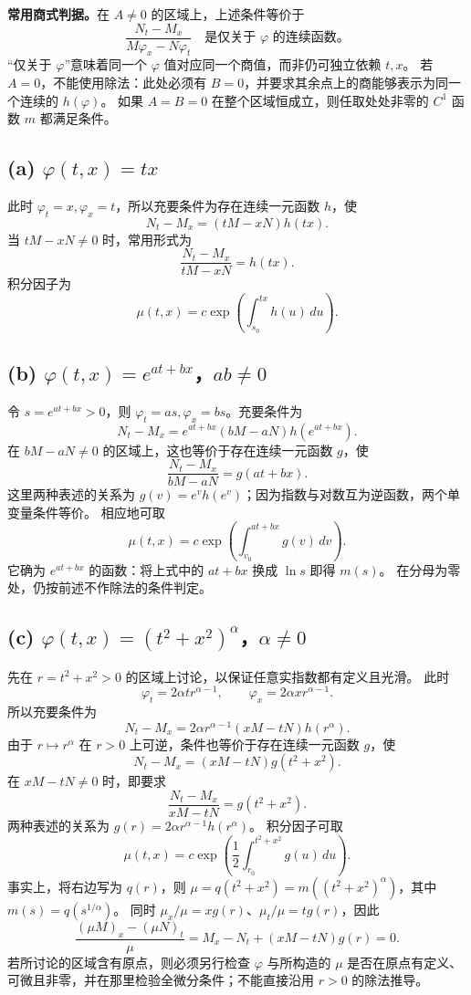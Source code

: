 \documentclass[11pt,a4paper]{ctexart}
\begin{document}
\textbf{常用商式判据。}在 $A\ne0$ 的区域上，上述条件等价于
\[\frac{N_t-M_x}{M\varphi_x-N\varphi_t}
\quad\text{是仅关于 $\varphi$ 的连续函数。}\]
“仅关于 $\varphi$”意味着同一个 $\varphi$ 值对应同一个商值，而非仍可独立依赖 $t,x$。
若 $A=0$，不能使用除法：此处必须有 $B=0$，并要求其余点上的商能够表示为同一个连续的 $h(\varphi)$。
如果 $A=B=0$ 在整个区域恒成立，则任取处处非零的 $C^1$ 函数 $m$ 都满足条件。

\subsection*{(a) $\varphi(t,x)=tx$}
此时 $\varphi_t=x,\varphi_x=t$，所以充要条件为存在连续一元函数 $h$，使
\[\boxed{N_t-M_x=(tM-xN)h(tx).}\]
当 $tM-xN\ne0$ 时，常用形式为
\[\boxed{\frac{N_t-M_x}{tM-xN}=h(tx).}\]
积分因子为
\[\boxed{\mu(t,x)=c\exp\left(\int_{s_0}^{tx}h(u)\,du\right).}\]

\subsection*{(b) $\varphi(t,x)=e^{at+bx}$，$ab\ne0$}
令 $s=e^{at+bx}>0$，则 $\varphi_t=as,\varphi_x=bs$。充要条件为
\[\boxed{N_t-M_x=e^{at+bx}(bM-aN)h(e^{at+bx}).}\]
在 $bM-aN\ne0$ 的区域上，这也等价于存在连续一元函数 $g$，使
\[\boxed{\frac{N_t-M_x}{bM-aN}=g(at+bx).}\]
这里两种表述的关系为 $g(v)=e^v h(e^v)$；因为指数与对数互为逆函数，两个单变量条件等价。
相应地可取
\[\boxed{\mu(t,x)=c\exp\left(\int_{v_0}^{at+bx}g(v)\,dv\right).}\]
它确为 $e^{at+bx}$ 的函数：将上式中的 $at+bx$ 换成 $\ln s$ 即得 $m(s)$。
在分母为零处，仍按前述不作除法的条件判定。

\subsection*{(c) $\varphi(t,x)=(t^2+x^2)^\alpha$，$\alpha\ne0$}
先在 $r=t^2+x^2>0$ 的区域上讨论，以保证任意实指数都有定义且光滑。
此时
\[\varphi_t=2\alpha t r^{\alpha-1},\qquad
\varphi_x=2\alpha x r^{\alpha-1}.
\]
所以充要条件为
\[\boxed{N_t-M_x=2\alpha r^{\alpha-1}(xM-tN)h(r^\alpha).}\]
由于 $r\mapsto r^\alpha$ 在 $r>0$ 上可逆，条件也等价于存在连续一元函数 $g$，使
\[\boxed{N_t-M_x=(xM-tN)g(t^2+x^2).}\]
在 $xM-tN\ne0$ 时，即要求
\[\boxed{\frac{N_t-M_x}{xM-tN}=g(t^2+x^2).}\]
两种表述的关系为 $g(r)=2\alpha r^{\alpha-1}h(r^\alpha)$。
积分因子可取
\[\boxed{\mu(t,x)=c\exp\left(\frac12\int_{r_0}^{t^2+x^2}g(u)\,du\right).}\]
事实上，将右边写为 $q(r)$，则 $\mu=q(t^2+x^2)=m((t^2+x^2)^\alpha)$，其中 $m(s)=q(s^{1/\alpha})$。
同时 $\mu_x/\mu=xg(r)$、$\mu_t/\mu=tg(r)$，因此
\[\frac{(\mu M)_x-(\mu N)_t}{\mu}
=M_x-N_t+(xM-tN)g(r)=0.
\]
若所讨论的区域含有原点，则必须另行检查 $\varphi$ 与所构造的 $\mu$ 是否在原点有定义、可微且非零，并在那里检验全微分条件；不能直接沿用 $r>0$ 的除法推导。
\end{document}
